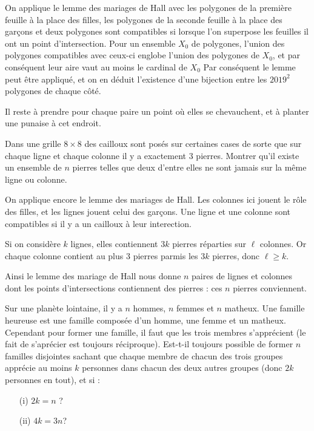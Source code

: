 \begin{sol}

On applique le lemme des mariages de Hall avec les polygones de la première feuille à la place des filles, les polygones de la seconde feuille à la place des garçons et deux polygones sont compatibles si lorsque l'on superpose les feuilles il ont un point d'intersection. Pour un ensemble $X_0$ de polygones, l'union des polygones compatibles avec ceux-ci englobe l'union des polygones de $X_0$, et par conséquent leur aire vaut au moins le cardinal de $X_0$ Par conséquent le lemme peut être appliqué, et on en déduit l'existence d'une bijection entre les $2019^2$ polygones de chaque côté.

\smallskip
 Il reste à prendre pour chaque paire un point où elles se chevauchent, et à planter une punaise à cet endroit.

\end{sol}

\begin{exo}
Dans une grille $8\times 8$ des cailloux sont posés sur certaines cases de sorte que sur chaque ligne et chaque colonne il y a exactement $3$ pierres. Montrer qu'il existe un ensemble de $n$ pierres telles que deux d'entre elles ne sont jamais sur la même ligne ou colonne. 
\end{exo}

\begin{sol}
On applique encore le lemme des mariages de Hall. Les colonnes ici jouent le rôle des filles, et les lignes jouent celui des garçons. Une ligne et une colonne sont compatibles si il y a un cailloux à leur interection. 

Si on considère $k$ lignes, elles contiennent $3k$ pierres réparties sur $\ell$ colonnes. Or chaque colonne contient au plus $3$ pierres parmis les $3k$ pierres, donc $\ell \geq k$. 

\smallskip

Ainsi le lemme des mariage de Hall nous donne $n$ paires de lignes et colonnes dont les points d'intersections contiennent des pierres : ces $n$ pierres conviennent.
\end{sol}

\begin{exo}

Sur une planète lointaine, il y a $n$ hommes, $n$ femmes et $n$ matheux. Une famille heureuse est une famille composée d'un homme, une femme et un matheux. Cependant pour former une famille, il faut que les trois membres s'apprécient (le fait de s'aprécier est toujours réciproque). Est-t-il toujours possible de former $n$ familles disjointes sachant que chaque membre de chacun des trois groupes apprécie au moins $k$ personnes dans chacun des deux autres groupes (donc $2k$ personnes en tout), et si :

\begin{itemize}
\item[(i)] $2k=n$ ?
\item[(ii)] $4k=3n$?
\end{itemize} 
\end{exo}

